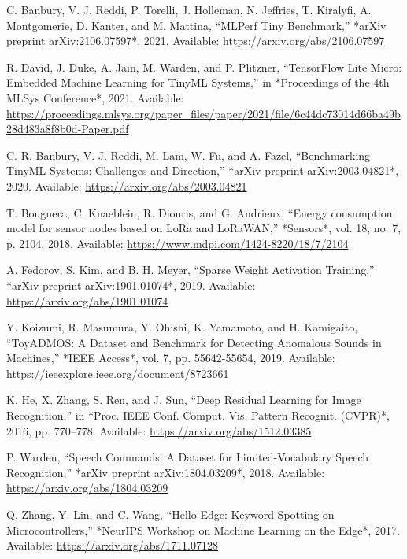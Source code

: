 \documentclass[conference]{IEEEtran}
\begin{document}
\begin{thebibliography}{00}

 C. Banbury, V. J. Reddi, P. Torelli, J. Holleman, N. Jeffries, T. Kiralyfi, A. Montgomerie, D. Kanter, and M. Mattina, ``MLPerf Tiny Benchmark,'' *arXiv preprint arXiv:2106.07597*, 2021. Available: \url{https://arxiv.org/abs/2106.07597}

 R. David, J. Duke, A. Jain, M. Warden, and P. Plitzner, ``TensorFlow Lite Micro: Embedded Machine Learning for TinyML Systems,'' in *Proceedings of the 4th MLSys Conference*, 2021. Available: \url{https://proceedings.mlsys.org/paper_files/paper/2021/file/6c44dc73014d66ba49b28d483a8f8b0d-Paper.pdf}

 C. R. Banbury, V. J. Reddi, M. Lam, W. Fu, and A. Fazel, ``Benchmarking TinyML Systems: Challenges and Direction,'' *arXiv preprint arXiv:2003.04821*, 2020. Available: \url{https://arxiv.org/abs/2003.04821}

 T. Bouguera, C. Knaeblein, R. Diouris, and G. Andrieux, ``Energy consumption model for sensor nodes based on LoRa and LoRaWAN,'' *Sensors*, vol. 18, no. 7, p. 2104, 2018. Available: \url{https://www.mdpi.com/1424-8220/18/7/2104}

 A. Fedorov, S. Kim, and B. H. Meyer, ``Sparse Weight Activation Training,'' *arXiv preprint arXiv:1901.01074*, 2019. Available: \url{https://arxiv.org/abs/1901.01074}

 Y. Koizumi, R. Masumura, Y. Ohishi, K. Yamamoto, and H. Kamigaito, ``ToyADMOS: A Dataset and Benchmark for Detecting Anomalous Sounds in Machines,'' *IEEE Access*, vol. 7, pp. 55642-55654, 2019. Available: \url{https://ieeexplore.ieee.org/document/8723661}

 K. He, X. Zhang, S. Ren, and J. Sun, ``Deep Residual Learning for Image Recognition,'' in *Proc. IEEE Conf. Comput. Vis. Pattern Recognit. (CVPR)*, 2016, pp. 770–778. Available: \url{https://arxiv.org/abs/1512.03385}

 P. Warden, ``Speech Commands: A Dataset for Limited-Vocabulary Speech Recognition,'' *arXiv preprint arXiv:1804.03209*, 2018. Available: \url{https://arxiv.org/abs/1804.03209}

 Q. Zhang, Y. Lin, and C. Wang, ``Hello Edge: Keyword Spotting on Microcontrollers,'' *NeurIPS Workshop on Machine Learning on the Edge*, 2017. Available: \url{https://arxiv.org/abs/1711.07128}


\end{thebibliography}
\end{document}
